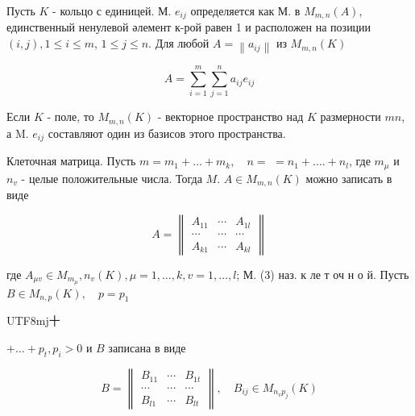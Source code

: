 \documentclass[10pt]{article}
\begin{document}
Пусть $K$ - кольцо с единицей. М. $e_{i j}$ определяется как М. в $M_{m, n}(A)$, единственный ненулевой әлемент к-рой равен 1 и расположен на позиции $(i, j), 1 \leqslant i \leqslant m$, $1 \leqslant j \leqslant n$. Для любой $A=\left\|a_{i j}\right\|$ из $M_{m, n}(K)$



\[

A=\sum_{i=1}^{m} \sum_{j=1}^{n} a_{i j} e_{i j}

\]



Если $K$ - поле, то $M_{m, n}(K)$ - векторное пространство над $K$ размерности $m n$, а M. $e_{i j}$ составляют один из базисов этого пространства.



Клеточная матрица. Пусть $m=m_{1}+\ldots+m_{k}, \quad n=$ $=n_{1}+\ldots .+n_{l}$, где $m_{\mu}$ и $n_{v}$ - целые положительные числа. Тогда $M$. $A \in M_{m, n}(K)$ можно записать в виде



\[

A=\left\|\begin{array}{ccc}

A_{11} & \cdots & A_{1 l} \\

\cdots & \cdots & \cdots \\

A_{k 1} & \cdots & A_{k l}

\end{array}\right\|

\]



где $A_{\mu v} \in M_{m_{\mu}}, n_{v}(K), \mu=1, \ldots, k, v=1, \ldots, l$; М. (3) наз. к ле т оч н о й. Пусть $B \in M_{n, p}(K), \quad p=p_{1}$ \begin{CJK}{UTF8}{mj}十\end{CJK} $+\ldots+p_{t}, p_{i}>0$ и $B$ записана в виде



\[

B=\left\|\begin{array}{ccc}

B_{11} & \cdots & B_{1 t} \\

\cdots & \cdots & \cdots \\

B_{l 1} & \cdots & B_{l t}

\end{array}\right\|, \quad B_{i j} \in M_{n_{v} p_{j}}(K)

\]
\end{document}

